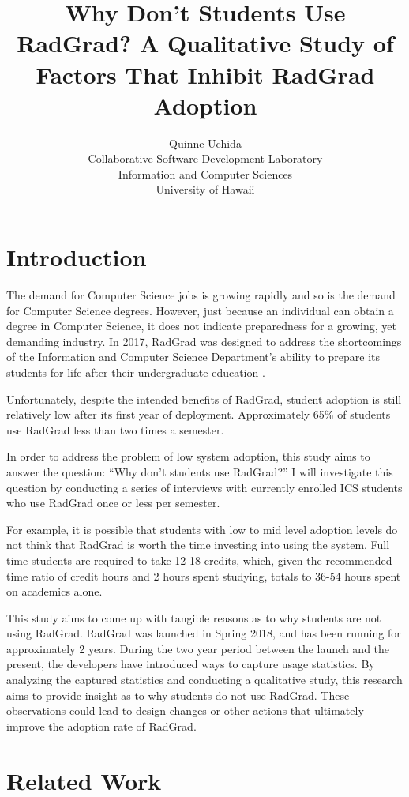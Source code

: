 \documentclass[english]{proposalnsf}
\title{Why Don't Students Use RadGrad? A Qualitative Study of Factors That Inhibit RadGrad Adoption}
\author{Quinne Uchida \\Collaborative Software Development Laboratory \\ Information and Computer Sciences \\ University of Hawaii}
\begin{document}
\maketitle
\newpage

\section{Introduction}
\label{introduction}

The demand for Computer Science jobs is growing rapidly and so is the demand for Computer Science degrees. However, just because an individual can obtain a degree in Computer Science, it does not indicate preparedness for a growing, yet demanding industry. In 2017, RadGrad was designed to address the shortcomings of the Information and Computer Science Department's ability to prepare its students for life after their undergraduate education \cite{Takayesu_RadGrad_2017}.

Unfortunately, despite the intended benefits of RadGrad, student adoption is still relatively low after its first year of deployment. Approximately 65{\%} of students use RadGrad less than two times a semester. 

In order to address the problem of low system adoption, this study aims to answer the question: ``Why don't students use RadGrad?'' I will investigate this question by conducting a series of interviews with currently enrolled ICS students who use RadGrad once or less per semester. 

For example, it is possible that students with low to mid level adoption levels do not think that RadGrad is worth the time investing into using the system. 
Full time students are required to take 12-18 credits, which, given the recommended time ratio of credit hours and 2 hours spent studying, totals to 36-54 hours spent on academics alone. 

This study aims to come up with tangible reasons as to why students are not using RadGrad. RadGrad was launched in Spring 2018, and has been running for approximately 2 years. During the two year period between the launch and the present, the developers have introduced ways to capture usage statistics. By analyzing the captured statistics and conducting a qualitative study, this research aims to provide insight as to why students do not use RadGrad. These observations could lead to design changes or other actions that ultimately improve the adoption rate of RadGrad.  

\section{Related Work}
\label{related-work}
\end{document}
